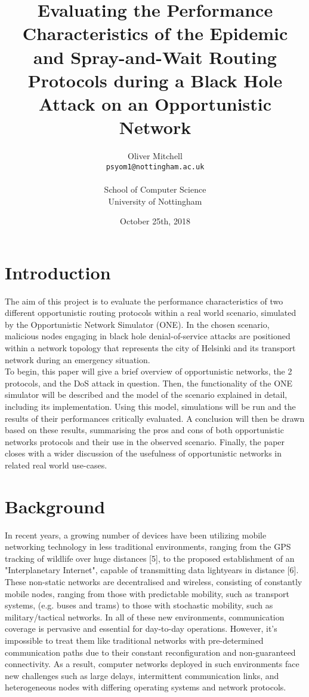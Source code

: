 \documentclass{article}
\title{Evaluating the Performance Characteristics of the Epidemic and Spray-and-Wait Routing Protocols during a Black Hole Attack on an Opportunistic Network }
\author{
  Oliver Mitchell\\
  \texttt{psyom1@nottingham.ac.uk}\\\\
  \textnormal{School of Computer Science}\\
  \textnormal{University of Nottingham}
}
\date{October 25th, 2018}
\begin{document}
\maketitle
 
\tableofcontents
\newpage

\section{Introduction}
The aim of this project is to evaluate the performance characteristics of two different opportunistic routing protocols within a real world scenario, simulated by the Opportunistic Network Simulator (ONE). In the chosen scenario, malicious nodes engaging in black hole denial-of-service attacks are positioned within a network topology that represents the city of Helsinki and its transport network during an emergency situation.\\
\newline
To begin, this paper will give a brief overview of opportunistic networks, the 2 protocols, and the DoS attack in question. Then, the functionality of the ONE simulator will be described and the model of the scenario explained in detail, including its implementation. Using this model, simulations will be run and the results of their performances critically evaluated. A conclusion will then be drawn based on these results, summarising the pros and cons of both opportunistic networks protocols and their use in the observed scenario. Finally, the paper closes with a wider discussion of the usefulness of opportunistic networks in related real world use-cases.

\section{Background}
In recent years, a growing number of devices have been utilizing mobile networking technology in less traditional environments, ranging from the GPS tracking of wildlife over huge distances [5], to the proposed establishment of an "Interplanetary Internet", capable of transmitting data lightyears in distance [6]. These non-static networks are decentralised and wireless, consisting of constantly mobile nodes, ranging from those with predictable mobility, such as transport systems, (e.g. buses and trams) to those with stochastic mobility, such as military/tactical networks. In all of these new environments, communication coverage is pervasive and essential for day-to-day operations. However, it's impossible to treat them like traditional networks with pre-determined communication paths due to their constant reconfiguration and non-guaranteed connectivity. As a result, computer networks deployed in such environments face new challenges such as large delays, intermittent communication links, and heterogeneous nodes with differing operating systems and network protocols.
\end{document}
